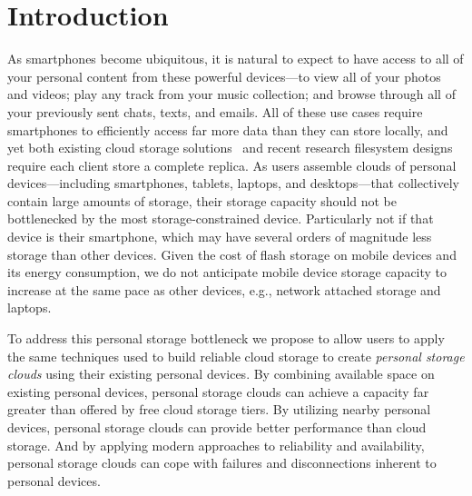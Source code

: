 
\section{Introduction}
\label{sec-introduction}

As smartphones become ubiquitous, it is natural to expect to have access to
all of your personal content from these powerful devices---to view all of
your photos and videos; play any track from your music collection; and browse
through all of your previously sent chats, texts, and emails. All of these
use cases require smartphones to efficiently access far more data than they
can store locally, and yet both existing cloud storage solutions~\cite{dropbox, googledrive}
and recent research filesystem designs~\cite{mashtizadeh2013replication, peek2006ensemblue}
require each client store a complete replica. As users assemble clouds of
personal devices---including smartphones, tablets, laptops, and
desktops---that collectively contain large amounts of storage, their storage
capacity should not be bottlenecked by the most storage-constrained device.
Particularly not if that device is their smartphone, which may have several
orders of magnitude less storage than other devices. Given the cost of flash
storage on mobile devices and its energy consumption, we do not anticipate
mobile device storage capacity to increase at the same pace as other devices,
e.g., network attached storage and laptops.


To address this personal storage bottleneck we propose to allow users to
apply the same techniques used to build reliable cloud storage to create
\textit{personal storage clouds} using their existing personal devices. By
combining available space on existing personal devices, personal storage
clouds can achieve a capacity far greater than offered by free cloud storage
tiers. By utilizing nearby personal devices, personal storage clouds can
provide better performance than cloud storage. And by applying modern
approaches to reliability and availability, personal storage clouds can cope
with failures and disconnections inherent to personal devices.

